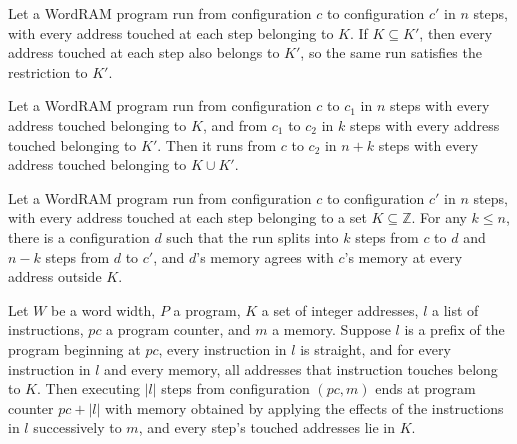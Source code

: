 \begin{theorem}
\label{WordRAM.StepsIn.mono}
\leanok
{}
Let a WordRAM program run from configuration $c$ to configuration $c'$ in $n$ steps,
with every address touched at each step belonging to $K$. If $K\subseteq K'$, then every
address touched at each step also belongs to $K'$, so the same run satisfies the
restriction to $K'$.
\end{theorem}

\begin{theorem}
\label{WordRAM.StepsIn.trans}
\leanok
{}
Let a WordRAM program run from configuration $c$ to $c_1$ in $n$ steps with every
address touched belonging to $K$, and from $c_1$ to $c_2$ in $k$ steps with every
address touched belonging to $K'$. Then it runs from $c$ to $c_2$ in $n+k$ steps with
every address touched belonging to $K\cup K'$.
\end{theorem}

\begin{theorem}
\label{WordRAM.StepsIn.agreeOutside}
\leanok
{}
Let a WordRAM program run from configuration $c$ to configuration $c'$ in $n$ steps,
with every address touched at each step belonging to a set $K\subseteq\mathbb Z$. For
any $k\le n$, there is a configuration $d$ such that the run splits into $k$ steps from
$c$ to $d$ and $n-k$ steps from $d$ to $c'$, and $d$'s memory agrees with $c$'s memory
at every address outside $K$.
\end{theorem}

\begin{theorem}
\label{WordRAM.stepsIn_straight}
\leanok
{}
Let $W$ be a word width, $P$ a program, $K$ a set of integer addresses, $l$ a list of
instructions, $pc$ a program counter, and $m$ a memory. Suppose $l$ is a prefix of the
program beginning at $pc$, every instruction in $l$ is straight, and for every
instruction in $l$ and every memory, all addresses that instruction touches belong to
$K$. Then executing $|l|$ steps from configuration $(pc,m)$ ends at program counter
$pc+|l|$ with memory obtained by applying the effects of the instructions in $l$
successively to $m$, and every step's touched addresses lie in $K$.
\end{theorem}

